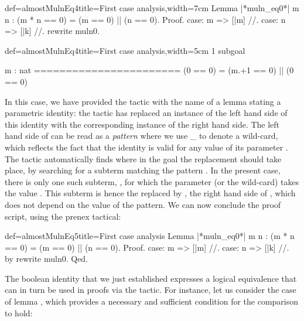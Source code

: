 \begin{coq}{def=almostMulnEq4}{title=First case analysis,width=7cm}
Lemma |*muln_eq0*| m n :
  (m * n == 0) = (m == 0) || (n == 0).
Proof.
case: m => [|m] //.
case: n => [|k] //.
rewrite muln0.
\end{coq}
\begin{coqout}{def=almostMulnEq4}{title=First case analysis,width=5cm}
1 subgoal

m : nat
=======================
(0 == 0) =
(m.+1 == 0) || (0 == 0)
\end{coqout}

In this case, we have provided the  tactic with the name
 of a lemma stating a parametric identity: the tactic has
replaced an instance of the left hand side of this identity with the
corresponding instance of the right hand side. The left hand side of
 can be read as a \emph{pattern}  where we use \_
to denote a wild-card, which reflects the fact that the identity is
valid for any value of its parameter . The tactic
automatically  finds  where in the goal the replacement should take
place, by searching for a subterm matching the pattern .
In the present case, there is only one such subterm,
, for which the parameter (or the wild-card) takes the
value . This subterm is hence the replaced by , the right
hand side of , which does not depend on the value of the
pattern. We can now conclude the proof script, using the
prenex  tactical:

\begin{coq}{def=almostMulnEq5}{title=First case analysis}
Lemma |*muln_eq0*| m n : (m * n == 0) = (m == 0) || (n == 0).
Proof.
case: m => [|m] //.
case: n => [|k] //.
by rewrite muln0.
Qed.
\end{coq}



The boolean identity  that we just established expresses a
logical equivalence that can in turn be used in proofs via the
 tactic. For instance, let us consider the case of lemma
, which provides a necessary and sufficient condition
for the comparison  to hold:

